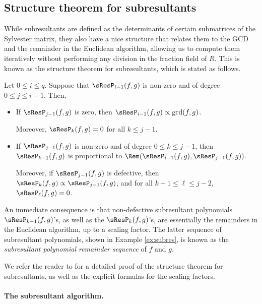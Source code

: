 \subsection{Structure theorem for subresultants}

While subresultants are defined as the determinants of certain submatrices of the Sylvester matrix, they also have a nice structure that relates them to the GCD and the remainder in the Euclidean algorithm, allowing us to compute them iteratively without performing any division in the fraction field of $R$. This is known as the structure theorem for subresultants, which is stated as follows.

\begin{theorem}
    Let $0\leq i\leq q$. Suppose that $\sResP_{i-1}(f,g)$ is non-zero and of degree $0\leq j\leq i-1$. Then,
    \begin{itemize}
        \item If $\sResP_{j-1}(f,g)$ is zero, then $\sResP_{i-1}(f,g)\propto\gcd(f,g)$.

              Moreover, $\sResP_{k}(f,g)=0$ for all $k\leq j-1$.

        \item If $\sResP_{j-1}(f,g)$ is non-zero and of degree $0\leq k\leq j-1$, then $\sResP_{k-1}(f,g)$ is proportional to $\Rem(\sResP_{i-1}(f,g),\sResP_{j-1}(f,g))$.

              Moreover, if $\sResP_{j-1}(f,g)$ is defective, then $\sResP_{k}(f,g)\propto\sResP_{j-1}(f,g)$, and for all $k+1\leq\ell\leq j-2$, $\sResP_{\ell}(f,g)=0$.
    \end{itemize}
\end{theorem}

An immediate consequence is that non-defective subresultant polynomials $\sResP_{k-1}(f,g)$'s, as well as the $\sResP_{k}(f,g)$'s, are essentially the remainders in the Euclidean algorithm, up to a scaling factor. The latter sequence of subresultant polynomials, shown in Example \ref{ex:subres}, is known as the \emph{subresultant polynomial remainder sequence} of $f$ and $g$.

We refer the reader to \cite[Chapter 8]{basu2006algorithms} for a detailed proof of the structure theorem for subresultants, as well as the explicit formulas for the scaling factors.

\paragraph{The subresultant algorithm.}

